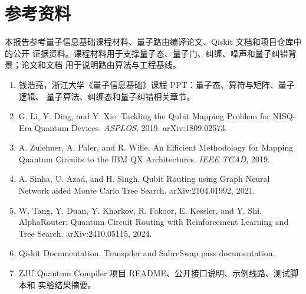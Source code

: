 \section*{参考资料}

本报告参考量子信息基础课程材料、量子路由编译论文、Qiskit 文档和项目仓库中的公开
证据资料。课程材料用于支撑量子态、量子门、纠缠、噪声和量子纠错背景；论文和文档
用于说明路由算法与工程基线。

\begin{enumerate}
  \item 钱浩亮，浙江大学《量子信息基础》课程 PPT：量子态、算符与矩阵、量子逻辑、
  量子算法、纠缠态和量子纠错相关章节。
  \item G. Li, Y. Ding, and Y. Xie. Tackling the Qubit Mapping Problem for
  NISQ-Era Quantum Devices. \textit{ASPLOS}, 2019. arXiv:1809.02573.
  \item A. Zulehner, A. Paler, and R. Wille. An Efficient Methodology for
  Mapping Quantum Circuits to the IBM QX Architectures. \textit{IEEE TCAD},
  2019.
  \item A. Sinha, U. Azad, and H. Singh. Qubit Routing using Graph Neural
  Network aided Monte Carlo Tree Search. arXiv:2104.01992, 2021.
  \item W. Tang, Y. Duan, Y. Kharkov, R. Fakoor, E. Kessler, and Y. Shi.
  AlphaRouter: Quantum Circuit Routing with Reinforcement Learning and Tree
  Search. arXiv:2410.05115, 2024.
  \item Qiskit Documentation. Transpiler and SabreSwap pass documentation.
  \item ZJU Quantum Compiler 项目 README、公开接口说明、示例线路、测试脚本和
  实验结果摘要。
\end{enumerate}
